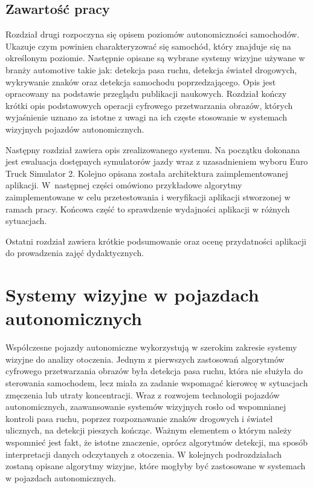 \section{Zawartość pracy}

Rozdział drugi rozpoczyna się opisem poziomów autonomiczności samochodów. 
Ukazuje czym powinien charakteryzować się samochód, który znajduje się na określonym poziomie.
Następnie opisane są wybrane systemy wizyjne używane w branży automotive takie jak: detekcja pasa ruchu, detekcja świateł drogowych, wykrywanie znaków oraz detekcja samochodu poprzedzającego.
Opis jest opracowany na podstawie przeglądu publikacji naukowych.
Rozdział kończy krótki opis podstawowych operacji cyfrowego przetwarzania obrazów, których wyjaśnienie uznano za istotne z uwagi na ich częste stosowanie w systemach wizyjnych pojazdów autonomicznych.

Następny rozdział zawiera opis zrealizowanego systemu. 
Na początku dokonana jest ewaluacja dostępnych symulatorów jazdy wraz z uzasadnieniem wyboru Euro Truck Simulator 2. 
Kolejno opisana została architektura zaimplementowanej aplikacji. 
W~następnej części omówiono przykładowe algorytmy zaimplementowane w celu przetestowania i weryfikacji aplikacji stworzonej w ramach pracy. 
Końcowa część to sprawdzenie wydajności aplikacji w różnych sytuacjach.

Ostatni rozdział zawiera krótkie podsumowanie oraz ocenę przydatności aplikacji do prowadzenia zajęć dydaktycznych.


\chapter{Systemy wizyjne w pojazdach autonomicznych}
Współczesne pojazdy autonomiczne wykorzystują w szerokim zakresie systemy wizyjne do analizy otoczenia. Jednym z pierwszych zastosowań algorytmów cyfrowego przetwarzania obrazów była detekcja pasa ruchu, która nie służyła do sterowania samochodem, lecz miała za zadanie wspomagać kierowcę w sytuacjach zmęczenia lub utraty koncentracji. Wraz z rozwojem technologii pojazdów autonomicznych, zaawansowanie systemów wizyjnych rosło od wspomnianej kontroli pasa ruchu, poprzez rozpoznawanie znaków drogowych i świateł ulicznych, na detekcji pieszych kończąc. Ważnym elementem o którym należy wspomnieć jest fakt, że istotne znaczenie, oprócz algorytmów detekcji, ma sposób interpretacji danych odczytanych z otoczenia. W kolejnych podrozdziałach zostaną opisane algorytmy wizyjne, które mogłyby być zastosowane w systemach w pojazdach autonomicznych. 

